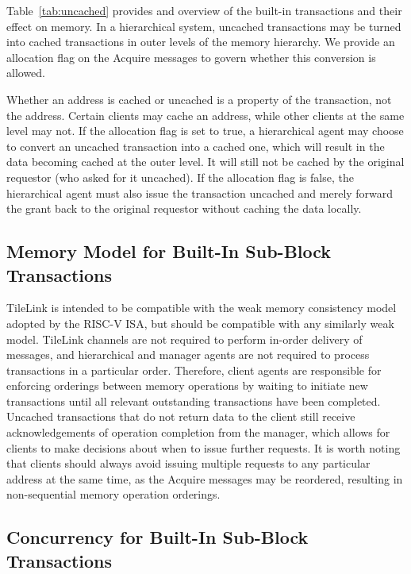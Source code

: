 Table~\ref{tab:uncached} provides and overview of the built-in transactions and their effect on memory.
In a hierarchical system, uncached transactions may be turned into cached transactions in outer levels of the memory hierarchy.
We provide an allocation flag on the Acquire messages to govern whether this conversion is allowed.

Whether an address is cached or uncached is a property of the transaction, not the address. Certain clients may cache an address, while other clients at the same level may not. If the allocation flag is set to true, a hierarchical agent may choose to convert an uncached transaction into a cached one, which will result in the data becoming cached at the outer level. It will still not be cached by the original requestor (who asked for it uncached). If the allocation flag is false, the hierarchical agent must also issue the transaction uncached and merely forward the grant back to the original requestor without caching the data locally.
 
\subsection{Memory Model for Built-In Sub-Block Transactions}

TileLink is intended to be compatible with the weak memory consistency model adopted by the RISC-V ISA, but should be compatible with any similarly weak model.
TileLink channels are not required to perform in-order delivery of messages, and hierarchical and manager agents are not required to process transactions in a particular order.
Therefore, client agents are responsible for enforcing orderings between memory operations by
waiting to initiate new transactions until all relevant outstanding transactions have been completed.
Uncached transactions that do not return data to the client still receive acknowledgements of operation completion from the manager, which allows for clients to make decisions about when to issue further requests.
It is worth noting that clients should always avoid issuing multiple requests to any particular address at the same time, as the Acquire messages may be reordered, resulting in non-sequential memory operation orderings.

\subsection{Concurrency for Built-In Sub-Block Transactions}

